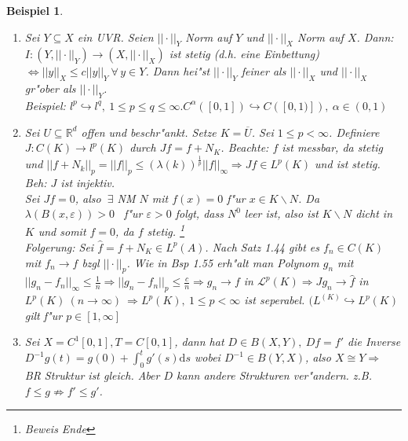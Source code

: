 \documentclass[a4paper,11pt]{book}
\newcommand{\R}{{\mathbb R}}
\newcommand{\sL}{{\mathcal L}}
\newcommand{\sn}[1]{||#1||_{\infty}}
\newcommand{\eps}{{\varepsilon}}
\def\d{\mbox{d}}
\newtheorem{Bsp}[Def]{Beispiel}
\theoremstyle{nonumberplain}
\begin{document}
\begin{Bsp}
\begin{enumerate}
\item[a)] Sei $Y \subseteq X$ ein UVR. Seien $||\cdot||_Y$ Norm auf $Y$ und $||\cdot||_X$ Norm auf $X$. Dann: $I: (Y,||\cdot||_Y) \rightarrow (X,||\cdot||_X)$ ist stetig (d.h. eine Einbettung) $\Leftrightarrow ||y||_X \leq c ||y||_Y \ \forall\, y \in Y$. Dann hei"st $||\cdot||_Y$ feiner als $||\cdot||_X$ und $||\cdot||_X$ gr"ober als $||\cdot||_Y$.\\
Beispiel: $l^p \hookrightarrow l^q,\ 1 \leq p \leq q \leq \infty. C^{\alpha}([0,1]) \hookrightarrow C([0,1)]),\ \alpha \in (0,1)$

\item[b)] Sei $U \subseteq \R^d$ offen und beschr"ankt. Setze $K = \overline{U}$. Sei $1 \leq p < \infty$. Definiere $J: C(K) \rightarrow l^p(K)$ durch $Jf = f+N_K$. Beachte: $f$ ist messbar, da stetig und $||f + N_k||_p = ||f||_p \leq (\lambda(k))^{\frac1{p}} \sn{f} \Rightarrow Jf \in L^p(K)$ und ist stetig.\\
\emph{Beh:} $J$ ist injektiv.\\
Sei $Jf = 0$, also $\ \exists$ NM $N$ mit $f(x) = 0$ f"ur $x \in K \backslash N$. Da $\lambda(B(x,\eps)) > 0$ \ f"ur $\eps > 0$ folgt, dass $N^0$ leer ist, also ist $K \backslash N$ dicht in $K$ und somit $f = 0$, da $f$ stetig. \footnote{Beweis Ende}\\
Folgerung: Sei $\hat{f} = f + N_K \in L^p(A)$. Nach Satz 1.44 gibt es $f_n \in C(K)$ mit $f_n \rightarrow f$ bzgl $||\cdot||_p$. Wie in Bsp 1.55 erh"alt man Polynom $g_n$ mit $\sn{g_n - f_n} \leq \frac1{n} \Rightarrow ||g_n-f_n||_p \leq \frac{c}{n} \Rightarrow g_n \rightarrow f$ in $\sL^p(K) \Rightarrow Jg_n \rightarrow \hat{f}$ in $L^p(K)\ (n \rightarrow \infty) \ \Rightarrow L^p(K),\ 1 \leq p < \infty$ ist seperabel. $(L^(K) \hookrightarrow L^p(K)$ gilt f"ur $p \in [1,\infty]$

\item[c)] Sei $X=C^1[0,1], T=C[0,1]$, dann hat $D \in B(X,Y),\ Df = f'$ die Inverse $D^{-1}g(t) = g(0) + \int_0^t g'(s)\d s$ wobei $D^{-1} \in B(Y,X)$, also $X \cong Y \Rightarrow$ BR Struktur ist gleich. Aber $D$ kann andere Strukturen ver"andern. z.B. $f \leq g \not\Rightarrow f' \leq g'$.
\end{enumerate}
\end{Bsp}
\end{document}
